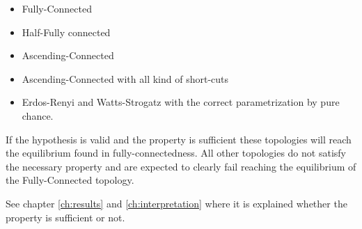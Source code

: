 \documentclass[Bachelorarbeit.tex]{subfiles}
\begin{document}
\begin{itemize}
\item Fully-Connected
\item Half-Fully connected
\item Ascending-Connected
\item Ascending-Connected with all kind of short-cuts
\item Erdos-Renyi and Watts-Strogatz with the correct parametrization by pure chance.
\end{itemize}

If the hypothesis is valid and the property is sufficient these topologies will reach the equilibrium found in fully-connectedness. All other topologies do not satisfy the necessary property and are expected to clearly fail reaching the equilibrium of the Fully-Connected topology.

\medskip

See chapter \ref{ch:results} and \ref{ch:interpretation} where it is explained whether the property is sufficient or not. 
\end{document}
